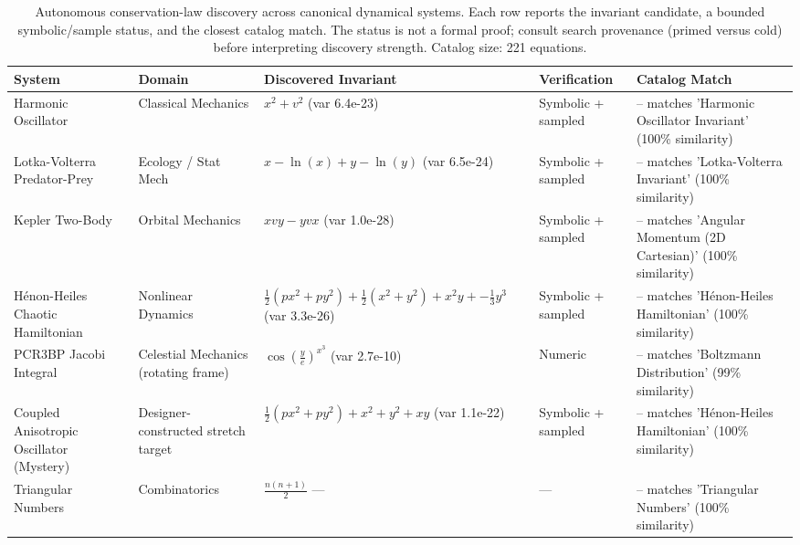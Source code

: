 \begin{table}[htbp]
\centering
\caption{Autonomous conservation-law discovery across canonical dynamical systems. Each row reports the invariant candidate, a bounded symbolic/sample status, and the closest catalog match. The status is not a formal proof; consult search provenance (primed versus cold) before interpreting discovery strength. Catalog size: 221 equations.}
\label{tab:ramanujan_showcase}
\begin{tabular}{lllll}
\toprule
System & Domain & Discovered Invariant & Verification & Catalog Match \\
\midrule
Harmonic Oscillator & Classical Mechanics & $x^{2} + v^{2}$ (var 6.4e-23) & Symbolic + sampled & -- matches 'Harmonic Oscillator Invariant' (100\% similarity) \\
Lotka-Volterra Predator-Prey & Ecology / Stat Mech & $x - \ln\left(x\right) + y - \ln\left(y\right)$ (var 6.5e-24) & Symbolic + sampled & -- matches 'Lotka-Volterra Invariant' (100\% similarity) \\
Kepler Two-Body & Orbital Mechanics & $x vy - y vx$ (var 1.0e-28) & Symbolic + sampled & -- matches 'Angular Momentum (2D Cartesian)' (100\% similarity) \\
Hénon-Heiles Chaotic Hamiltonian & Nonlinear Dynamics & $\frac{1}{2} \left(px^{2} + py^{2}\right) + \frac{1}{2} \left(x^{2} + y^{2}\right) + x^{2} y + -\frac{1}{3} y^{3}$ (var 3.3e-26) & Symbolic + sampled & -- matches 'Hénon-Heiles Hamiltonian' (100\% similarity) \\
PCR3BP Jacobi Integral & Celestial Mechanics (rotating frame) & $\cos\left(\frac{y}{e}\right)^{x^{3}}$ (var 2.7e-10) & Numeric & -- matches 'Boltzmann Distribution' (99\% similarity) \\
Coupled Anisotropic Oscillator (Mystery) & Designer-constructed stretch target & $\frac{1}{2} \left(px^{2} + py^{2}\right) + x^{2} + y^{2} + x y$ (var 1.1e-22) & Symbolic + sampled & -- matches 'Hénon-Heiles Hamiltonian' (100\% similarity) \\
Triangular Numbers & Combinatorics & $\frac{n \left(n + 1\right)}{2}$ — & — & -- matches 'Triangular Numbers' (100\% similarity) \\
\bottomrule
\end{tabular}
\end{table}
